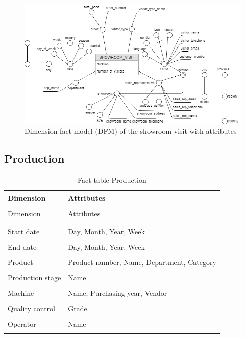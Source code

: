 \documentclass[letterpaper,12pt]{article}
\begin{document}
\begin{figure}[H] 
        \centering
        \includegraphics[width=\columnwidth]{../images/DFM_Showroom.png}
        \caption{
                \label{fig:showroomAttributes}  
                Dimension fact model (DFM) of the showroom visit with attributes 
        }
\end{figure}

\subsection{Production}

\begingroup
\renewcommand\arraystretch{0.5}
\begin{longtable}{p{4cm}p{9cm}}
        \caption{Fact table Production} \\
        Dimension & Attributes \\
        \endfirsthead \\
        Dimension & Attributes \\
        \endhead \\
        \hline \\
        Start date & Day, Month, Year, Week \\
        \hline \\
        End date & Day, Month, Year, Week \\
        \hline \\
        Product & Product number, Name, Department, Category \\
        \hline \\
        Production stage & Name \\
        \hline \\
        Machine & Name, Purchasing year, Vendor \\
        \hline \\
        Quality control & Grade \\
        \hline \\
        Operator & Name \\
        \hline \\
\end{longtable}
\endgroup
\end{document}
